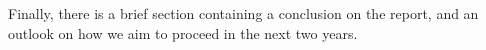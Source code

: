 Finally, there is a brief section containing a conclusion on the report, and an outlook on how we aim to proceed in the next two years.


\makeatletter
\edef\fontandleading{\@memptsize.0/\the\baselineskip}
\makeatother









